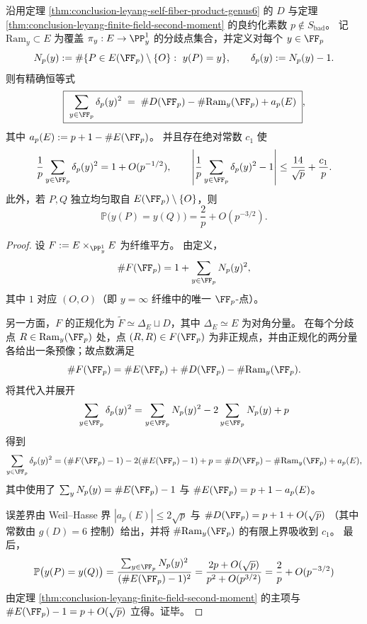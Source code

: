 \begin{corollary}[纤维偏差的二阶矩恒等式与碰撞概率的主项]\label{cor:conclusion-leyang-delta-second-moment-collision}
沿用定理 \ref{thm:conclusion-leyang-self-fiber-product-genus6} 的 \(D\) 与定理 \ref{thm:conclusion-leyang-finite-field-second-moment} 的良约化素数 \(p\notin S_{\mathrm{bad}}\)。
记 \(\mathrm{Ram}_y\subset E\) 为覆盖 \(\pi_y:E\to\PP^1_y\) 的分歧点集合，并定义对每个 \(y\in\FF_p\)
\[
N_p(y):=\#\{P\in E(\FF_p)\setminus\{O\}:\ y(P)=y\},
\qquad
\delta_p(y):=N_p(y)-1.
\]
则有精确恒等式
\[
\boxed{\;
\sum_{y\in\FF_p}\delta_p(y)^2
\;=\;
\#D(\FF_p)-\#\mathrm{Ram}_y(\FF_p)+a_p(E)\; },
\]
其中 \(a_p(E):=p+1-\#E(\FF_p)\)。
并且存在绝对常数 \(c_1\) 使
\[
\frac{1}{p}\sum_{y\in\FF_p}\delta_p(y)^2
=1+O(p^{-1/2}),
\qquad
\left|\frac{1}{p}\sum_{y\in\FF_p}\delta_p(y)^2-1\right|
\le \frac{14}{\sqrt p}+\frac{c_1}{p}.
\]
此外，若 \(P,Q\) 独立均匀取自 \(E(\FF_p)\setminus\{O\}\)，则
\[
\mathbb P\bigl(y(P)=y(Q)\bigr)=\frac{2}{p}+O(p^{-3/2}).
\]
\end{corollary}
\begin{proof}
设
\(
F:=E\times_{\PP^1_y}E
\)
为纤维平方。
由定义，
\[
\#F(\FF_p)=1+\sum_{y\in\FF_p}N_p(y)^2,
\]
其中 \(1\) 对应 \((O,O)\)（即 \(y=\infty\) 纤维中的唯一 \(\FF_p\)-点）。
\par
另一方面，\(F\) 的正规化为 \(\widetilde F\simeq \Delta_E\sqcup D\)，其中 \(\Delta_E\simeq E\) 为对角分量。
在每个分歧点 \(R\in\mathrm{Ram}_y(\FF_p)\) 处，点 \((R,R)\in F(\FF_p)\) 为非正规点，并由正规化的两分量各给出一条预像；故点数满足
\[
\#F(\FF_p)=\#E(\FF_p)+\#D(\FF_p)-\#\mathrm{Ram}_y(\FF_p).
\]
将其代入并展开
\[
\sum_{y\in\FF_p}\delta_p(y)^2
=\sum_{y\in\FF_p}N_p(y)^2-2\sum_{y\in\FF_p}N_p(y)+p
\]
得到
\[
\sum_{y\in\FF_p}\delta_p(y)^2
=(\#F(\FF_p)-1)-2(\#E(\FF_p)-1)+p
=\#D(\FF_p)-\#\mathrm{Ram}_y(\FF_p)+a_p(E),
\]
其中使用了 \(\sum_y N_p(y)=\#E(\FF_p)-1\) 与 \(\#E(\FF_p)=p+1-a_p(E)\)。
\par
误差界由 Weil--Hasse 界
\(
|a_p(E)|\le 2\sqrt p
\)
与
\(
\#D(\FF_p)=p+1+O(\sqrt p)
\)
（其中常数由 \(g(D)=6\) 控制）给出，并将 \(\#\mathrm{Ram}_y(\FF_p)\) 的有限上界吸收到 \(c_1\)。
最后，
\[
\mathbb P\bigl(y(P)=y(Q)\bigr)
=\frac{\sum_{y\in\FF_p}N_p(y)^2}{(\#E(\FF_p)-1)^2}
=\frac{2p+O(\sqrt p)}{p^2+O(p^{3/2})}
=\frac{2}{p}+O(p^{-3/2})
\]
由定理 \ref{thm:conclusion-leyang-finite-field-second-moment} 的主项与 \(\#E(\FF_p)-1=p+O(\sqrt p)\) 立得。证毕。
\end{proof}
\endinput
